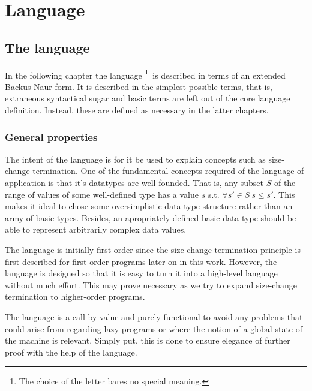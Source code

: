 \chapter{Language}

\section{The language }

In the following chapter the language \footnote{The choice of the
letter  bares no special meaning.}\ is described in terms of an
extended Backus-Naur form\footnotemark. It is described in the simplest
possible terms, that is, extraneous syntactical sugar and basic terms are left
out of the core language definition.  Instead, these are defined as necessary
in the latter chapters.


\subsection{General properties}

The intent of the language is for it be used to explain concepts such as
size-change termination. One of the fundamental concepts required of the
language of application is that it's datatypes are well-founded. That is, any
subset $S$ of the range of values of some well-defined type has a value $s$
s.t. $\forall {s'\in S}\ s\leq s'$. This makes it ideal to chose some
oversimplistic data type structure rather than an army of basic types. Besides,
an apropriately defined basic data type should be able to represent arbitrarily
complex data values.

The language is initially first-order since the size-change termination
principle is first described for first-order programs later on in this work.
However, the language is designed so that it is easy to turn it into a
high-level language without much effort. This may prove necessary as we try to
expand size-change termination to higher-order programs.

The language is a call-by-value and purely functional to avoid any problems
that could arise from regarding lazy programs or where the notion of a global
state of the machine is relevant. Simply put, this is done to ensure elegance
of further proof with the help of the language.

